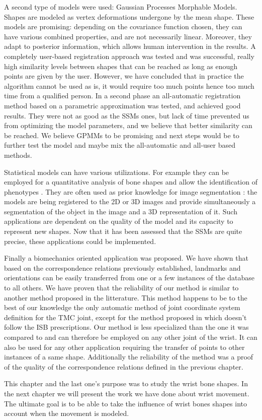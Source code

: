 A second type of models were used: Gaussian Processes Morphable Models. Shapes are modeled as vertex deformations undergone by the mean shape. These models are promising: depending on the covariance function chosen, they can have various combined properties, and are not necessarily linear. Moreover, they adapt to posterior information, which allows human intervention in the results. A completely user-based registration approach was tested and was successful, really high similarity levels between shapes that can be reached as long as enough points are given by the user. However, we have concluded that in practice the algorithm cannot be used as is, it would require too much points hence too much time from a qualified person. In a second phase an all-automatic registration method based on a parametric approximation was tested, and achieved good results. They were not as good as the SSMs ones, but lack of time prevented us from optimizing the model parameters, and we believe that better similarity can be reached. We believe GPMMs to be promising and next steps would be to further test the model and maybe mix the all-automatic and all-user based methods. 

Statistical models can have various utilizations. For example they can be employed for a quantitative analysis of bone shapes and allow the identification of phenotypes \cite{chaudhari_2014_global}. They are often used as prior knowledge for image segmentation \cite{chen_2012_automatic, anas_2014_statistical}: the models are being registered to the 2D or 3D images and provide simultaneously a segmentation of the object in the image and a 3D representation of it. Such applications are dependent on the quality of the model and its capacity to represent new shapes. Now that it has been assessed that the SSMs are quite precise, these applications could be implemented. 


Finally a biomechanics oriented application was proposed. We have shown that based on the correspondence relations previously established, landmarks and orientations can be easily transferred from one or a few instances of the database to all others. We have proven that the reliability of our method is similar to another method proposed in the litterature. This method happens to be to the best of our knowledge the only automatic method of joint coordinate system definition for the TMC joint, except for the method proposed in \cite{coburn_2007_coordinate} which doesn't follow the ISB prescriptions. Our method is less specialized than the one it was compared to and can therefore be employed on any other joint of the wrist. It can also be used for any other application requiring the transfer of points to other instances of a same shape. Additionally the reliability of the method was a proof of the quality of the correspondence relations defined in the previous chapter. 

This chapter and the last one's purpose was to study the wrist bone shapes. In the next chapter we will present the work we have done about wrist movement. The ultimate goal is to be able to take the influence of wrist bones shapes into account when the movement is modeled. 